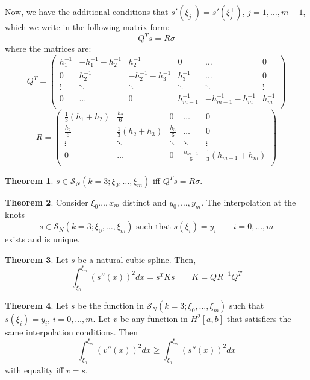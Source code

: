 \documentclass[12pt, openany]{report}
\theoremstyle{definition}
\newtheorem{thm}{Theorem}[chapter]
\begin{document}
Now, we have the additional conditions that $s'(\xi_j^-)=s'(\xi_j^+)$, $j=1,\dots,m-1$, which we write in the following matrix form:
\begin{equation}
    Q^Ts=R\sigma
\end{equation}
where the matrices are:
\begin{equation}
    Q^T = \begin{pmatrix}
        h_1^{-1} & -h_1^{-1}-h_2^{-1} & h_2^{-1} & 0 & \dots & 0\\
        0 & h_2^{-1} & -h_2^{-1}-h_3^{-1} & h_3^{-1} & \dots & 0\\
        \vdots & \ddots & \ddots & \ddots & \ddots & \vdots \\
        0 & \dots & 0 & h_{m-1}^{-1} & -h_{m-1}^{-1}-h_m^{-1} & h_m^{-1}\\
    \end{pmatrix}
\end{equation}
\begin{equation}
    R = \begin{pmatrix}
        \frac{1}{3} (h_1+h_2) & \frac{h_2}{6} & 0 & \dots & 0\\
        \frac{h_2}{6} & \frac{1}{3}(h_2+h_3) & \frac{h_3}{6} & \dots & 0\\
        \vdots & \ddots & \ddots  & \ddots & \vdots\\
        0 & \dots & 0 & \frac{h_{m-1}}{6} & \frac{1}{3}(h_{m-1}+h_m)\\
    \end{pmatrix}
\end{equation}
\begin{thm}
    $s\in \mathcal{S}_N(k=3;\xi_0,\dots,\xi_m)$ iff $Q^Ts=R\sigma$.
\end{thm}
\begin{thm}
    Consider $\xi_0\dots,x_m$ distinct and $y_0,\dots,y_m$. The interpolation at the knots 
    \begin{equation}
        s\in \mathcal{S}_N(k=3;\xi_0,\dots,\xi_m) \text{ such that }s(\xi_i) = y_i \qquad i=0,\dots, m
    \end{equation}
    exists and is unique.
\end{thm}
\begin{thm}
    Let $s$ be a natural cubic spline. Then, 
    \begin{equation}
        \int_{\xi_0}^{\xi_m} \left(s''(x)\right)^2dx = s^TKs \qquad K = QR^{-1}Q^T
    \end{equation}
\end{thm}
\begin{thm}
    Let $s$ be the function in $\mathcal{S}_N(k=3;\xi_0,\dots,\xi_m)$ such that $s(\xi_i)=y_i$, $i=0,\dots,m$. Let $v$ be any function in $H^2[a,b]$ that satisfiers the same interpolation conditions. Then 
    \begin{equation}
        \int_{\xi_0}^{\xi_m} \left(v''(x)\right)^2dx\ge \int_{\xi_0}^{\xi_m} \left(s''(x)\right)^2dx
    \end{equation}
    with equality iff $v=s$.
\end{thm}
\end{document}
